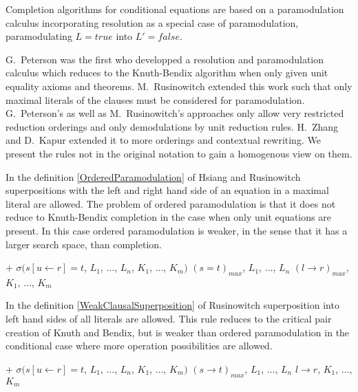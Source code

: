 Completion algorithms for conditional equations are based on a
para\-mo\-du\-la\-tion calculus incorporating resolution as a special case of
paramodulation, paramodulating $L=true$ into $L'=false$.

G.\ Peterson \cite{Peterson83} was the first who developped a resolution
and pa\-ra\-mo\-du\-la\-tion calculus which reduces to the Knuth-Bendix algorithm
when only given unit equality axioms and theorems. M.\ Rusinowitch
\cite{HsRu86,Rusinowitch87} extended this work such that only maximal
literals of the clauses must be considered for paramodulation. G.\
Peterson's as well as M.\ Rusinowitch's approaches only allow very
restricted reduction orderings and only demodulations by unit reduction
rules.
H.\ Zhang and D.\ Kapur \cite{ZhKa88} extended it to more orderings and
contextual rewriting. We present the rules not in the original notation to
gain a homogenous view on them.

In the definition \ref{OrderedParamodulation} of Hsiang and Rusinowitch
superpositions with the left and right hand side of an equation in a
maximal literal are allowed. The problem of ordered paramodulation is that
it does not reduce to Knuth-Bendix completion in the case when only unit
equations are present. In this case ordered paramodulation is weaker, in
the sense that
it has a larger search space, than completion.

\begin{Def}
\return\vspace{-3mm}
\label{OrderedParamodulation}


\hlineblocktwo%
{+}%
{$\sigma(s[u\leftarrow r] = t$, $L_1$, $\dots$, $L_n$, $K_1$,
$\dots$, $K_m)$}%
{$(s = t)_{max}$, $L_1$, $\dots$, $L_n$}%
{$(l \rightarrow r)_{max}$, $K_1$, $\dots$, $K_m$}
\end{Def}

In the definition \ref{WeakClausalSuperposition} of Rusinowitch
superposition into left hand sides of all literals are allowed. This rule
reduces to the critical pair creation of Knuth and Bendix, but is weaker
than ordered paramodulation in the conditional case where more operation
possibilities are allowed.

\begin{Def}
\return\vspace{-3mm}
\label{WeakClausalSuperposition}


\hlineblocktwo%
{+}%
{$\sigma(s[u\leftarrow r] = t$, $L_1$, $\dots$, $L_n$, $K_1$,
$\dots$, $K_m)$}%
{$(s \rightarrow t)_{max}$, $L_1$, $\dots$, $L_n$}%
{$l \rightarrow r$, $K_1$, $\dots$, $K_m$}
\end{Def}

